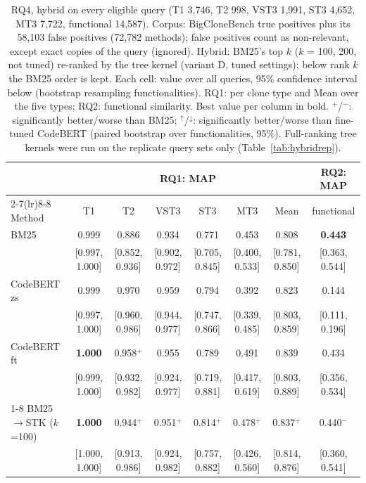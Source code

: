 \begin{table}[!htbp]
\centering
\caption{RQ4, hybrid on every eligible query (T1 3,746, T2 998, VST3 1,991, ST3 4,652, MT3 7,722, functional 14,587). Corpus: BigCloneBench true positives plus its 58,103 false positives (72,782 methods); false positives count as non-relevant, except exact copies of the query (ignored). Hybrid: BM25's top $k$ ($k$ = 100, 200, not tuned) re-ranked by the tree kernel (variant D, tuned settings); below rank $k$ the BM25 order is kept. Each cell: value over all queries, 95\% confidence interval below (bootstrap resampling functionalities). RQ1: per clone type and Mean over the five types; RQ2: functional similarity. Best value per column in bold. $^{+}$/$^{-}$: significantly better/worse than BM25; $^{\uparrow}$/$^{\downarrow}$: significantly better/worse than fine-tuned CodeBERT (paired bootstrap over functionalities, 95\%). Full-ranking tree kernels were run on the replicate query sets only (Table~\ref{tab:hybridrep}).}
\label{tab:hybridfull}
\scriptsize
\setlength{\tabcolsep}{3pt}
\begin{tabular}{lccccccc}
\toprule
 & \multicolumn{6}{c}{RQ1: MAP} & RQ2: MAP \\ \cmidrule(lr){2-7}\cmidrule(lr){8-8}
Method & T1 & T2 & VST3 & ST3 & MT3 & Mean & functional \\
\midrule
\quad BM25 & 0.999 & 0.886 & 0.934 & 0.771 & 0.453 & 0.808 & \textbf{0.443} \\
 & [0.997, 1.000] & [0.852, 0.936] & [0.902, 0.972] & [0.705, 0.845] & [0.400, 0.533] & [0.781, 0.850] & [0.363, 0.544] \\[2pt]
\quad CodeBERT zs & 0.999 & 0.970 & 0.959 & 0.794 & 0.392 & 0.823 & 0.144 \\
 & [0.997, 1.000] & [0.960, 0.986] & [0.944, 0.977] & [0.747, 0.866] & [0.339, 0.485] & [0.803, 0.859] & [0.111, 0.196] \\[2pt]
\quad CodeBERT ft & \textbf{1.000} & 0.958$^{+}$ & 0.955 & 0.789 & 0.491 & 0.839 & 0.434 \\
 & [0.999, 1.000] & [0.932, 0.982] & [0.924, 0.977] & [0.719, 0.881] & [0.417, 0.619] & [0.803, 0.889] & [0.356, 0.534] \\[2pt]
\cmidrule(lr){1-8}
\quad BM25$\rightarrow$STK ($k$=100) & \textbf{1.000} & 0.944$^{+}$ & 0.951$^{+}$ & 0.814$^{+}$ & 0.478$^{+}$ & 0.837$^{+}$ & 0.440$^{-}$ \\
 & [1.000, 1.000] & [0.913, 0.986] & [0.924, 0.982] & [0.757, 0.882] & [0.426, 0.560] & [0.814, 0.876] & [0.360, 0.541] \\[2pt]

\end{tabular}
\end{table}
